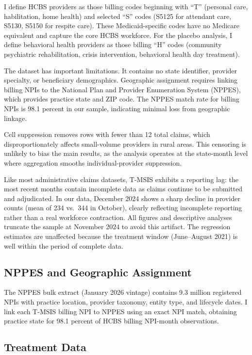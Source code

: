 \documentclass[12pt]{article}
\begin{document}
I define HCBS providers as those billing codes beginning with ``T'' (personal care, habilitation, home health) and selected ``S'' codes (S5125 for attendant care, S5130, S5150 for respite care). These Medicaid-specific codes have no Medicare equivalent and capture the core HCBS workforce. For the placebo analysis, I define behavioral health providers as those billing ``H'' codes (community psychiatric rehabilitation, crisis intervention, behavioral health day treatment).

The dataset has important limitations. It contains no state identifier, provider specialty, or beneficiary demographics. Geographic assignment requires linking billing NPIs to the National Plan and Provider Enumeration System (NPPES), which provides practice state and ZIP code. The NPPES match rate for billing NPIs is 98.1 percent in our sample, indicating minimal loss from geographic linkage.

Cell suppression removes rows with fewer than 12 total claims, which disproportionately affects small-volume providers in rural areas. This censoring is unlikely to bias the main results, as the analysis operates at the state-month level where aggregation smooths individual-provider suppression.

Like most administrative claims datasets, T-MSIS exhibits a reporting lag: the most recent months contain incomplete data as claims continue to be submitted and adjudicated. In our data, December 2024 shows a sharp decline in provider counts (mean of 234 vs.\ 344 in October), clearly reflecting incomplete reporting rather than a real workforce contraction. All figures and descriptive analyses truncate the sample at November 2024 to avoid this artifact. The regression estimates are unaffected because the treatment window (June--August 2021) is well within the period of complete data.

\subsection{NPPES and Geographic Assignment}

The NPPES bulk extract (January 2026 vintage) contains 9.3 million registered NPIs with practice location, provider taxonomy, entity type, and lifecycle dates. I link each T-MSIS billing NPI to NPPES using an exact NPI match, obtaining practice state for 98.1 percent of HCBS billing NPI-month observations.

\subsection{Treatment Data}
\end{document}
